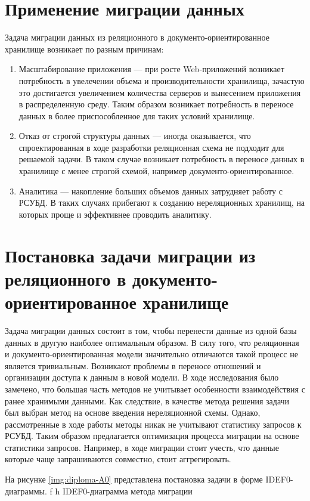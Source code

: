 \section{Применение миграции данных}
Задача миграции данных из реляционного в документо-ориентированное хранилище возникает по разным причинам:
\begin{enumerate}
    \item Масштабирование приложения --- при росте Web-приложений возникает потребность в увелечении объема и производительности хранилища,
    зачастую это достигается увеличением количества серверов и вынесением приложения в распределенную среду.
    Таким образом возникает потребность в переносе данных в более приспособленное для таких условий хранилище.
    
    \item Отказ от строгой структуры данных --- иногда оказывается, что спроектированная в ходе разработки реляционная схема не подходит для решаемой задачи.
    В таком случае возникает потребность в переносе данных в хранилище с менее строгой схемой, например документо-ориентированное.

    \item Аналитика --- накопление больших объемов данных затрудняет работу с РСУБД.
    В таких случаях прибегают к созданию нереляционных хранилищ, на которых проще и эффективнее проводить аналитику.
\end{enumerate}

\clearpage

\section{Постановка задачи миграции из реляционного в \mbox{документо-ориентированное} хранилище}
Задача миграции данных состоит в том, 
чтобы перенести данные из одной базы данных в другую наиболее оптимальным образом.
В силу того, что реляционная и документо-ориентированная модели
значительно отличаются такой процесс не является тривиальным.
Возникают проблемы в переносе отношений и организации доступа к данным в новой модели.
В ходе исследования было замечено, что большая часть методов не
учитывает особенности взаимодействия с ранее хранимыми данными.
Как следствие, в качестве метода решения задачи был выбран метод на основе введения нереляционной схемы.
Однако, рассмотренные в ходе работы методы никак не учитывают статистику запросов к РСУБД. 
Таким образом предлагается оптимизация процесса миграции на основе статистики запросов.
Например, в ходе миграции стоит учесть, что данные которые чаще запрашиваются совместно, стоит аггрегировать.

\clearpage

На рисунке \ref{img:diploma-A0} представлена постановка задачи в форме IDEF0-диаграммы.
    {f}
    {h}
    {\textwidth}
    {IDEF0-диаграмма метода миграции}
